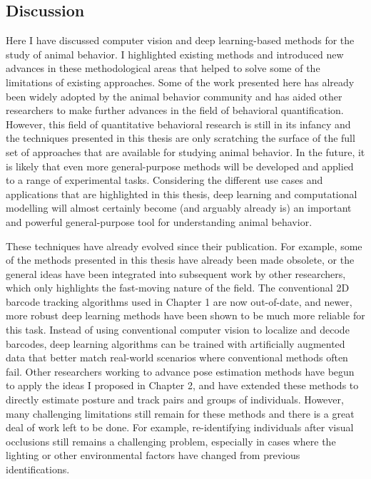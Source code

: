 \documentclass[11pt,a4paper,twoside]{book}
\begin{document}
\begin{doublespace}
\chapter*{Discussion}
Here I have discussed computer vision and deep learning-based methods for the study of animal behavior. I highlighted existing methods and introduced new advances in these methodological areas that helped to solve some of the limitations of existing approaches. Some of the work presented here has already been widely adopted by the animal behavior community and has aided other researchers to make further advances in the field of behavioral quantification. However, this field of quantitative behavioral research is still in its infancy and the techniques presented in this thesis are only scratching the surface of the full set of approaches that are available for studying animal behavior. In the future, it is likely that even more general-purpose methods will be developed and applied to a range of experimental tasks. Considering the different use cases and applications that are highlighted in this thesis, deep learning and computational modelling will almost certainly become (and arguably already is) an important and powerful general-purpose tool for understanding animal behavior. 

These techniques have already evolved since their publication. For example, some of the methods presented in this thesis have already been made obsolete, or the general ideas have been integrated into subsequent work by other researchers, which only highlights the fast-moving nature of the field. The conventional 2D barcode tracking algorithms used in Chapter 1 are now out-of-date, and newer, more robust deep learning methods have been shown to be much more reliable for this task. Instead of using conventional computer vision to localize and decode barcodes, deep learning algorithms can be trained with artificially augmented data that better match real-world scenarios where conventional methods often fail. Other researchers working to advance pose estimation methods have begun to apply the ideas I proposed in Chapter 2, and have extended these methods to directly estimate posture and track pairs and groups of individuals. However, many challenging limitations still remain for these methods and there is a great deal of work left to be done. For example, re-identifying individuals after visual occlusions still remains a challenging problem, especially in cases where the lighting or other environmental factors have changed from previous identifications.


\end{doublespace}
\end{document}
